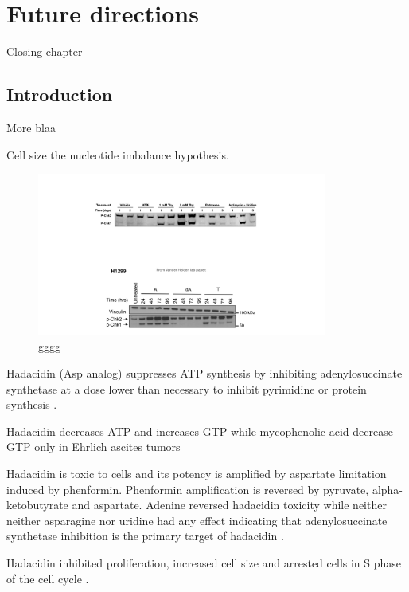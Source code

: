 \chapter{Future directions}
\label{chap6}


Closing chapter 

\section{Introduction}
More blaa

Cell size the nucleotide imbalance hypothesis.



\begin{figure}
    \centering
    \includegraphics[width=0.85\textwidth]{figures/chap6/P_Chk_wstrn.pdf}
    \caption[gggg]{
    gggg
    }
    \label{fig:ch6:P_Chk_wstrn}
\end{figure}



Hadacidin (Asp analog) suppresses ATP synthesis by inhibiting adenylosuccinate synthetase at a dose lower than necessary to inhibit pyrimidine or protein synthesis \cite{Shigeura1962-nu, Shigeura1962-ot}.

Hadacidin decreases ATP and increases GTP while mycophenolic acid decrease GTP only in Ehrlich ascites tumors \cite{Barankiewicz2011-ak}

Hadacidin is toxic to cells and its potency is amplified by aspartate limitation induced by phenformin.
Phenformin amplification is reversed by pyruvate, alpha-ketobutyrate and aspartate.
Adenine reversed hadacidin toxicity while neither neither asparagine nor uridine had any effect indicating that adenylosuccinate synthetase inhibition is the primary target of hadacidin \cite{Neuman1963-dx}.

Hadacidin inhibited proliferation, increased cell size and arrested cells in S phase of the cell cycle \cite{Ladino1989-rj}.






